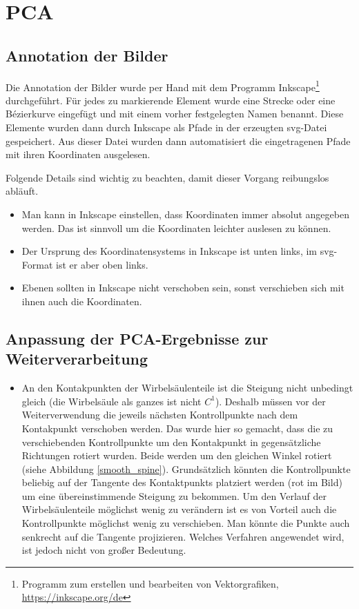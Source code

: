 \section{PCA}
\label{section_pca}
\subsection{Annotation der Bilder}

Die Annotation der Bilder wurde per Hand mit dem Programm Inkscape\footnote{Programm zum erstellen und bearbeiten von Vektorgrafiken, \url{https://inkscape.org/de}} durchgeführt. Für jedes zu markierende Element wurde eine Strecke oder eine Bézierkurve eingefügt und mit einem vorher festgelegten Namen benannt. Diese Elemente wurden dann durch Inkscape als Pfade in der erzeugten svg-Datei gespeichert. Aus dieser Datei wurden dann automatisiert die eingetragenen Pfade mit ihren Koordinaten ausgelesen.

Folgende Details sind wichtig zu beachten, damit dieser Vorgang reibungslos abläuft. 
\begin{itemize}
 \item Man kann in Inkscape einstellen, dass Koordinaten immer absolut angegeben werden. Das ist sinnvoll um die Koordinaten leichter auslesen zu können.
 \item Der Ursprung des Koordinatensystems in Inkscape ist unten links, im svg-Format ist er aber oben links.
 \item Ebenen sollten in Inkscape nicht verschoben sein, sonst verschieben sich mit ihnen auch die Koordinaten.  
\end{itemize}

\subsection{Anpassung der PCA-Ergebnisse zur Weiterverarbeitung}

\begin{itemize}
 \item An den Kontakpunkten der Wirbelsäulenteile ist die Steigung nicht unbedingt gleich (die Wirbelsäule als ganzes ist nicht $C^1$). Deshalb müssen vor der Weiterverwendung die jeweils nächsten Kontrollpunkte nach dem Kontakpunkt verschoben werden. Das wurde hier so gemacht, dass die zu verschiebenden Kontrollpunkte um den Kontakpunkt in gegensätzliche Richtungen rotiert wurden. Beide werden um den gleichen Winkel rotiert (siehe Abbildung \ref{smooth_spine}). Grundsätzlich könnten die Kontrollpunkte beliebig auf der Tangente des Kontaktpunkts platziert werden (rot im Bild) um eine übereinstimmende Steigung zu bekommen. Um den Verlauf der Wirbelsäulenteile möglichst wenig zu verändern ist es von Vorteil auch die Kontrollpunkte möglichst wenig zu verschieben. Man könnte die Punkte \zb auch senkrecht auf die Tangente projizieren. Welches Verfahren angewendet wird, ist jedoch nicht von großer Bedeutung. 
\end{itemize}

